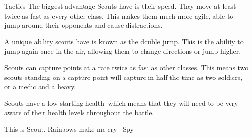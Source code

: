 Tactics
The biggest advantage Scouts have is their speed. They move at least twice as fast as every other class.  This makes them much more agile, able to jump around their opponents and cause distractions.

A unique ability scouts have is known as the double jump.  This is the ability to jump again once in the air, allowing them to change directions or jump higher.

Scouts can capture points at a rate twice as fast as other classes.  This means two scouts standing on a capture point will capture in half the time as two soldiers, or a medic and a heavy.

Scouts have a low starting health, which means that they will need to be very aware of their health levels throughout the battle.  

This is Scout. Rainbows make me cry ~Spy